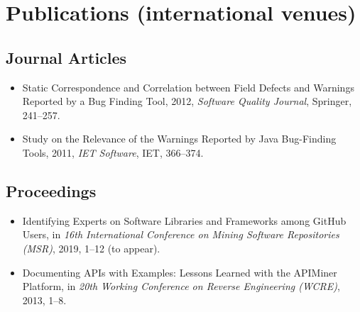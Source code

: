 \section*{Publications {\footnotesize (international venues)}}

\subsection*{Journal Articles}
\begin{itemize}
  \item Static Correspondence and Correlation between Field Defects and Warnings Reported by a Bug Finding Tool, 2012, {\it Software Quality Journal}, Springer, 241--257.
  \item Study on the Relevance of the Warnings Reported by Java Bug-Finding Tools, 2011, {\it IET Software}, IET, 366--374.
\end{itemize}

\subsection*{Proceedings}
\begin{itemize}
  \item Identifying Experts on Software Libraries and Frameworks among GitHub Users, in \textit{16th International Conference on Mining Software Repositories (MSR)}, 2019, 1--12 (to appear).
  \item Documenting APIs with Examples: Lessons Learned with the APIMiner Platform, in \textit{20th Working Conference on Reverse Engineering (WCRE)}, 2013, 1--8.
\end{itemize}
